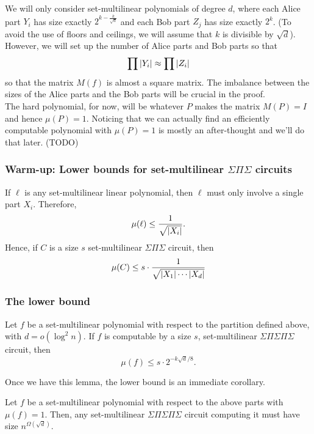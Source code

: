 We will only consider set-multilinear polynomials of degree $d$, where each Alice part $Y_i$ has size exactly $2^{k - \frac{k}{\sqrt{d}}}$ and each Bob part $Z_j$ has size exactly $2^k$. (To avoid the use of floors and ceilings, we will assume that $k$ is divisible by $\sqrt{d}$). However, we will set up the number of Alice parts and Bob parts so that
\[
  \prod \left|Y_i\right| \approx \prod \left|Z_i\right|
\]
so that the matrix $M(f)$ is almost a square matrix. The imbalance between the sizes of the Alice parts and the Bob parts will be crucial in the proof.\\

The hard polynomial, for now, will be whatever $P$ makes the matrix $M(P) = I$ and hence $\mu(P) = 1$. Noticing that we can actually find an efficiently computable polynomial with $\mu(P) = 1$ is mostly an after-thought and we'll do that later. (TODO)

\subsubsection{Warm-up: Lower bounds for set-multilinear $\Sigma\Pi\Sigma$ circuits}

If $\ell$ is any set-multilinear linear polynomial, then $\ell$ must only involve a single part $X_i$. Therefore,
\[
  \mu(\ell) \leq \frac{1}{\sqrt{\left|X_i\right|}}. 
\]
Hence, if $C$ is a size $s$ set-multilinear $\Sigma\Pi\Sigma$ circuit, then
\[
  \mu(C) \leq s \cdot \frac{1}{\sqrt{\left|X_1\right| \cdots \left|X_d\right|}}
\]

\subsubsection{The lower bound}

\begin{lemma}\label{lem:lb-sml-depth-5}
  Let $f$ be a set-multilinear polynomial with respect to the partition defined above, with $d = o(\log^2 n)$. If $f$ is computable by a size $s$, set-multilinear $\Sigma\Pi\Sigma\Pi\Sigma$ circuit, then
  \[
    \mu(f) \leq s \cdot 2^{-k \sqrt{d}/8}. 
  \]
\end{lemma}

Once we have this lemma, the lower bound is an immediate corollary.

\begin{corollarywp}
  Let $f$ be a set-multilinear polynomial with respect to the above parts with $\mu(f) = 1$. Then, any set-multilinear $\Sigma\Pi\Sigma\Pi\Sigma$ circuit computing it must have size $n^{\Omega(\sqrt{d})}$. 
\end{corollarywp}


